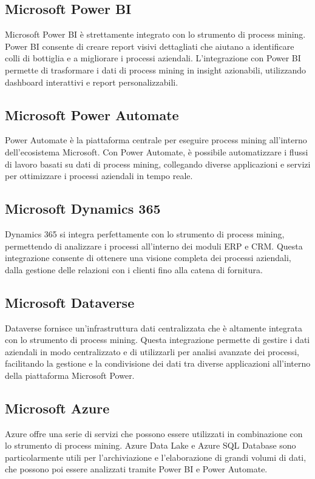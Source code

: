 \documentclass{article}
\begin{document}
\subsection{Microsoft Power BI}
Microsoft Power BI è strettamente integrato con lo strumento di process mining. Power BI consente di creare report visivi dettagliati che aiutano a identificare colli di bottiglia e a migliorare i processi aziendali. L'integrazione con Power BI permette di trasformare i dati di process mining in insight azionabili, utilizzando dashboard interattivi e report personalizzabili.

\subsection{Microsoft Power Automate}
Power Automate è la piattaforma centrale per eseguire process mining all'interno dell'ecosistema Microsoft. Con Power Automate, è possibile automatizzare i flussi di lavoro basati su dati di process mining, collegando diverse applicazioni e servizi per ottimizzare i processi aziendali in tempo reale.

\subsection{Microsoft Dynamics 365}
Dynamics 365 si integra perfettamente con lo strumento di process mining, permettendo di analizzare i processi all'interno dei moduli ERP e CRM. Questa integrazione consente di ottenere una visione completa dei processi aziendali, dalla gestione delle relazioni con i clienti fino alla catena di fornitura.

\subsection{Microsoft Dataverse}
Dataverse fornisce un'infrastruttura dati centralizzata che è altamente integrata con lo strumento di process mining. Questa integrazione permette di gestire i dati aziendali in modo centralizzato e di utilizzarli per analisi avanzate dei processi, facilitando la gestione e la condivisione dei dati tra diverse applicazioni all'interno della piattaforma Microsoft Power.

\subsection{Microsoft Azure}
Azure offre una serie di servizi che possono essere utilizzati in combinazione con lo strumento di process mining. Azure Data Lake e Azure SQL Database sono particolarmente utili per l'archiviazione e l'elaborazione di grandi volumi di dati, che possono poi essere analizzati tramite Power BI e Power Automate.
\end{document}
